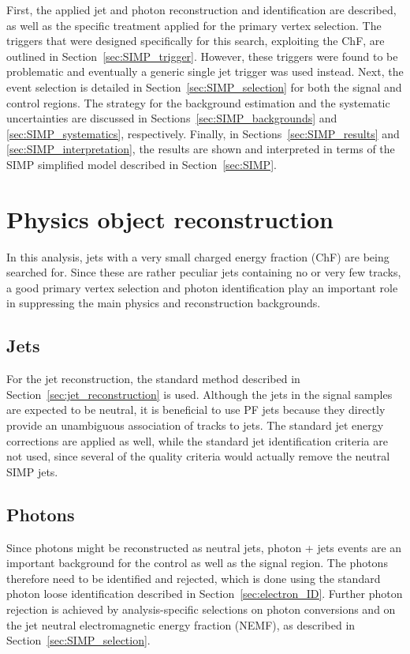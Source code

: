 First, the applied jet and photon reconstruction and identification are described, as well as the specific treatment applied for the primary vertex selection. The triggers that were designed specifically for this search, exploiting the ChF, are outlined in Section~\ref{sec:SIMP_trigger}. However, these triggers were found to be problematic and eventually a generic single jet trigger was used instead. Next, the event selection is detailed in Section~\ref{sec:SIMP_selection} for both the signal and control regions. The strategy for the background estimation and the systematic uncertainties are discussed in Sections~\ref{sec:SIMP_backgrounds} and \ref{sec:SIMP_systematics}, respectively. Finally,  in Sections~\ref{sec:SIMP_results} and \ref{sec:SIMP_interpretation}, the results are shown and interpreted in terms of the \ac{SIMP} simplified model described in Section~\ref{sec:SIMP}.

\section{Physics object reconstruction} 
\label{sec:SIMP_reconstruction}

In this analysis, jets with a very small charged energy fraction (ChF) are being searched for. Since these are rather peculiar jets containing no or very few tracks, a good primary vertex selection and photon identification play an important role in suppressing the main physics and reconstruction backgrounds.

\subsection{Jets}

For the jet reconstruction, the standard method described in Section~\ref{sec:jet_reconstruction} is used. Although the jets in the signal samples are expected to be neutral, it is beneficial to use \ac{PF} jets because they directly provide an unambiguous association of tracks to jets. The standard jet energy corrections are applied as well, while the standard jet identification criteria are not used, since several of the quality criteria would actually remove the neutral \ac{SIMP} jets.

\subsection{Photons}

Since photons might be reconstructed as neutral jets, photon + jets events are an important background for the control as well as the signal region. The photons therefore need to be identified and rejected, which is done using the standard photon loose identification described in Section~\ref{sec:electron_ID}. Further photon rejection is achieved by analysis-specific selections on photon conversions and on the jet neutral electromagnetic energy fraction (NEMF), as described in Section~\ref{sec:SIMP_selection}.

